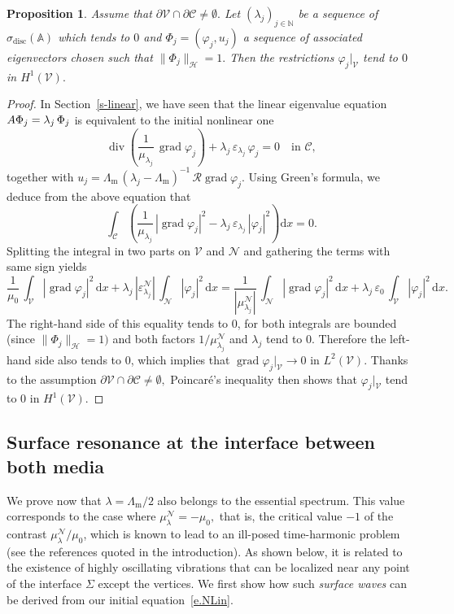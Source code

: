 \documentclass[11pt]{article}
\newtheorem{prop}[theo]{Proposition}
\theoremstyle{definition}
\numberwithin{equation}{section}
\numberwithin{figure}{section}
\numberwithin{table}{section}
\DeclareMathOperator{\Div}{div}
\DeclareMathOperator{\grad}{grad}
\DeclareMathOperator{\disc}{disc}
\newcommand{\epsl}{\varepsilon}
\newcommand{\calC}{\mathcal{C}}
\newcommand{\calH}{\mathcal{H}}
\newcommand{\calN}{\mathcal{N}}
\newcommand{\calR}{\mathcal{R}}
\newcommand{\calV}{\mathcal{V}}
\newcommand{\bbA}{\mathbb{A}}
\newcommand{\bbN}{\mathbb{N}}
\newcommand{\rmd}{{\mathrm{d}}}
\newcommand{\Lm}{{\Lambda_{\mathrm{m}}}}
\begin{document}
\begin{prop}\label{prop3.4}
Assume that $\partial\calV \cap \partial\calC \neq \emptyset.$ Let $(\lambda_j)_{j \in \bbN}$ be a sequence of $\sigma_{\disc}(\bbA)$ which tends to $0$ and $\Phi_j = (\varphi_j,u_j)$ a sequence of associated eigenvectors chosen such that $\| \Phi_j \|_\calH = 1.$ Then the restrictions $\varphi_j|_\calV$ tend to $0$ in $H^1(\calV).$
\end{prop}

\begin{proof}
In Section~\ref{s-linear}, we have seen that the linear eigenvalue equation $A \Phi_j\linebreak= \lambda_j\,\Phi_j$ is equivalent to the initial nonlinear one
\[
\Div \left(\frac{1}{\mu_{\lambda_j}}\, \grad\varphi_j \right) + \lambda_j\,\epsl_{\lambda_j}\,\varphi_j = 0
\quad\text{in }\calC,
\]
together with $u_j = \Lm \, (\lambda_j-\Lm)^{-1} \, \calR \grad\varphi_j.$ Using Green's formula, we deduce from the above equation that
\[
\int_\calC \left(\frac{1}{\mu_{\lambda_j}}\, |\grad\varphi_j|^2 - \lambda_j\,\epsl_{\lambda_j}\,|\varphi_j|^2 \right) \rmd x = 0.
\]
Splitting the integral in two parts on $\calV$ and $\calN$ and gathering the terms with same sign yields
\[
\frac{1}{\mu_0}\,\int_\calV |\grad\varphi_j|^2 \,\rmd x +
\lambda_j\,|\epsl^\calN_{\lambda_j}| \,\int_\calN |\varphi_j|^2 \,\rmd x = \frac{1}{|\mu^\calN_{\lambda_j}|}\,\int_\calN |\grad\varphi_j|^2 \,\rmd x +
\lambda_j\,\epsl_0 \,\int_\calV |\varphi_j|^2 \,\rmd x.
\]
The right-hand side of this equality tends to 0, for both integrals are bounded (since $\| \Phi_j \|_\calH = 1)$ and both factors $1/\mu^\calN_{\lambda_j}$ and $\lambda_j$ tend to 0. Therefore the left-hand side also tends to 0, which implies that $\grad\varphi_j|_\calV \to 0$ in $L^2(\calV).$ Thanks to the assumption $\partial\calV \cap \partial\calC \neq \emptyset,$ Poincaré's inequality then shows that $\varphi_j|_\calV$ tend to $0$ in $H^1(\calV).$
\end{proof}

\subsection{Surface resonance at the interface between both media}\label{s-surface-reson}
We prove now that $\lambda = \Lm/2$ also belongs to the essential spectrum. This value corresponds to the case where $\mu_\lambda^\calN = -\mu_0,$ that is, the critical value $-1$ of the contrast $\mu_\lambda^\calN/\mu_0$, which is known to lead to an ill-posed time-harmonic problem (see the references quoted in the introduction). As shown below, it is related to the existence of highly oscillating vibrations that can be localized near any point of the interface $\Sigma$ except the vertices. We first show how such \emph{surface waves} can be derived from our initial equation~\eqref{e.NLin}.
\end{document}
